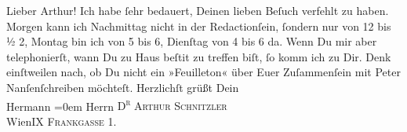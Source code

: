 \begin{ledgroupsized}[t]{13cm}
           \pstart\center{}Lieber Arthur!\pend\pstart
           Ich habe ſehr bedauert, Deinen lieben Beſuch verfehlt zu haben. Morgen kann ich
               Nachmittag nicht in der Redactionſein, ſondern nur von 12 bis ½ 2, Montag bin ich
               von 5 bis 6, Dienſtag von 4 bis 6 da. Wenn Du mir aber telephonierſt, wann Du zu Haus
                  beſti{\geminationm}t {\pb}zu treffen
               biſt, ſo komm ich zu Dir. Denk einſtweilen nach, ob Du nicht ein »Feuilleton« über
               Euer Zuſammenſein mit Peter Nanſenſchreiben möchteſt. Herzlichſt grüßt\pend
           \pstart
           Dein{\\[\baselineskip]}\spacefill\mbox{Hermann}\pend
           \leftskip=0em{}\pstart
           \noindent{}Herrn \textsc{D\textsuperscript{r} Arthur Schnitzler}{\\}WienIX \textsc{Frankgasse} 1.\pend
           \pstart
           \textcolor{gray}{\textbf{\label{T_L00584_1v}\label{T_L00584_1h}}}\pend
           
         
         \endnumbering{}\end{ledgroupsized}  \newcommand{\dateiname}{L00584}\newcommand{\titel}{Hermann Bahr an Arthur Schnitzler, 4. 9. 1896}\newcommand{\editorInnen}{ Kurt Ifkovits,  Martin Anton Müller}
      